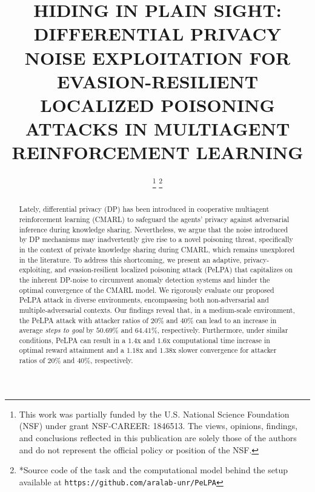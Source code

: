 \documentclass[conference]{IEEEtran}
\begin{document}
    
\title{\Large \uppercase{Hiding in Plain Sight: Differential Privacy Noise Exploitation for Evasion-resilient Localized Poisoning Attacks in Multiagent Reinforcement Learning}}

\author{



\thanks{This work was partially funded by the U.S. National Science Foundation (NSF) under grant NSF-CAREER: 1846513.  The views, opinions, findings, and conclusions reflected in this publication are solely those of the authors and do not represent the official policy or position of the NSF.}
\thanks{*Source code of the task and the computational model behind the setup available at {\tt \small https://github.com/aralab-unr/PeLPA}}%

}

\IEEEaftertitletext{\vspace{-1.0\baselineskip}}

\maketitle




\begin{abstract}
Lately, differential privacy (DP) has been introduced in cooperative multiagent reinforcement learning (CMARL) to safeguard the agents' privacy against adversarial inference during knowledge sharing. Nevertheless, we argue that the noise introduced by DP mechanisms may inadvertently give rise to a novel poisoning threat, specifically in the context of private knowledge sharing during CMARL, which remains unexplored in the literature. To address this shortcoming, we present an adaptive, privacy-exploiting, and evasion-resilient localized poisoning attack (PeLPA) that capitalizes on the inherent DP-noise to circumvent anomaly detection systems and hinder the optimal convergence of the CMARL model. We rigorously evaluate our proposed PeLPA attack in diverse environments, encompassing both non-adversarial and multiple-adversarial contexts. Our findings reveal that, in a medium-scale environment, the PeLPA attack with attacker ratios of $20\%$ and $40\%$ can lead to an increase in average \textit{steps to goal} by $50.69\%$ and $64.41\%$, respectively. Furthermore, under similar conditions, PeLPA can result in a $1.4$x and $1.6$x computational time increase in optimal reward attainment and a $1.18$x and $1.38$x slower convergence for attacker ratios of $20\%$ and $40\%$, respectively.
\end{abstract}
\end{document}
